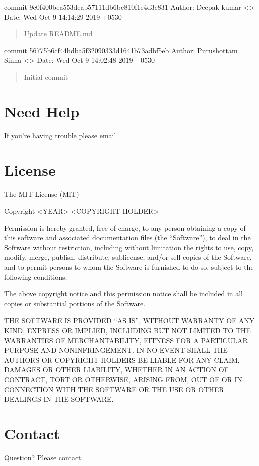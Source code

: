 \documentclass[letterpaper,10pt,english]{sphinxmanual}
\begin{document}
commit 9c0f400bea553deab57111db6bc810f1e4d3c831
Author: Deepak kumar \textless{}\textgreater{}
Date:   Wed Oct 9 14:14:29 2019 +0530
\begin{quote}

Update README.md
\end{quote}

commit 56775b6cf44bdba5f32090333d1641b73adbf5eb
Author: Purushottam Sinha \textless{}\textgreater{}
Date:   Wed Oct 9 14:02:48 2019 +0530
\begin{quote}

Initial commit
\end{quote}


\chapter{Need Help}
\label{\detokenize{help:need-help}}\label{\detokenize{help::doc}}
If you’re having trouble please email 


\chapter{License}
\label{\detokenize{license:license}}\label{\detokenize{license::doc}}
The MIT License (MIT)

Copyright \textless{}YEAR\textgreater{} \textless{}COPYRIGHT HOLDER\textgreater{}

Permission is hereby granted, free of charge, to any person obtaining a copy of this software and associated documentation files (the “Software”), to deal in the Software without restriction, including without limitation the rights to use, copy, modify, merge, publish, distribute, sublicense, and/or sell copies of the Software, and to permit persons to whom the Software is furnished to do so, subject to the following conditions:

The above copyright notice and this permission notice shall be included in all copies or substantial portions of the Software.

THE SOFTWARE IS PROVIDED “AS IS”, WITHOUT WARRANTY OF ANY KIND, EXPRESS OR IMPLIED, INCLUDING BUT NOT LIMITED TO THE WARRANTIES OF MERCHANTABILITY, FITNESS FOR A PARTICULAR PURPOSE AND NONINFRINGEMENT. IN NO EVENT SHALL THE AUTHORS OR COPYRIGHT HOLDERS BE LIABLE FOR ANY CLAIM, DAMAGES OR OTHER LIABILITY, WHETHER IN AN ACTION OF CONTRACT, TORT OR OTHERWISE, ARISING FROM, OUT OF OR IN CONNECTION WITH THE SOFTWARE OR THE USE OR OTHER DEALINGS IN THE SOFTWARE.


\chapter{Contact}
\label{\detokenize{license:contact}}
Question? Please contact 



\renewcommand{\indexname}{Index}
\printindex
\end{document}
